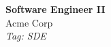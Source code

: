\documentclass[11pt]{article}
\begin{document}
\begin{center}
  {\LARGE \textbf{Software Engineer II}} \\[4pt]
  {\large Acme Corp} \\[2pt]
  {\small \textit{Tag: SDE}}
\end{center}

\vspace{1em}
\noindent
\end{document}

